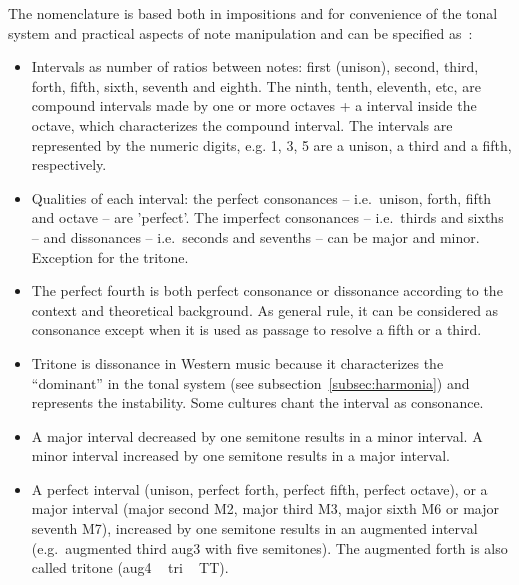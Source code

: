 \documentclass[
 aip,
 jmp,
 amsmath,amssymb,
 reprint,
]{revtex4-1}
\begin{document}
The nomenclature is based both in impositions and for convenience of the tonal system and practical aspects of note manipulation and can be specified
as~\cite{Roederer,Wisnick}:

\begin{itemize}
                \item Intervals as number of ratios between notes: first
                (unison), second, third, forth, fifth, sixth, seventh and
                eighth. The ninth, tenth, eleventh, etc, are compound                       intervals made by one or more octaves + a interval inside the                 octave, which characterizes the compound interval. The                        intervals are represented by the numeric digits, e.g. 1, 3, 5                 are a unison, a third and a fifth, respectively.

                \item Qualities of each interval: the perfect consonances --
                i.e.\ unison, forth, fifth and octave -- are 'perfect'. The
                imperfect consonances -- i.e.\ thirds and sixths -- and
                dissonances -- i.e.\ seconds and sevenths -- can be major and
                minor. Exception for the tritone.

                \item The perfect fourth is both perfect consonance or
                dissonance according to the context and theoretical
                background. As general rule, it can be considered as                        consonance except when it is used as passage to resolve a                   fifth or a third.

                \item Tritone is dissonance in Western music because
                it characterizes the ``dominant'' in the tonal system (see
                subsection~\ref{subsec:harmonia}) and represents the
                instability. Some cultures chant the interval as consonance. 

                \item A major interval decreased by one semitone results in a
                minor interval. A minor interval increased by one semitone
                results in a major interval.

                \item A perfect interval (unison, perfect forth, perfect                    fifth, perfect octave), or a major interval (major second M2,                 major third M3, major sixth M6 or major seventh M7), increased                 by one semitone results in an augmented interval (e.g.\                    augmented third aug3 with five semitones). The augmented forth                 is also called tritone (aug4 ~ tri ~ TT).


\end{itemize}
\end{document}
